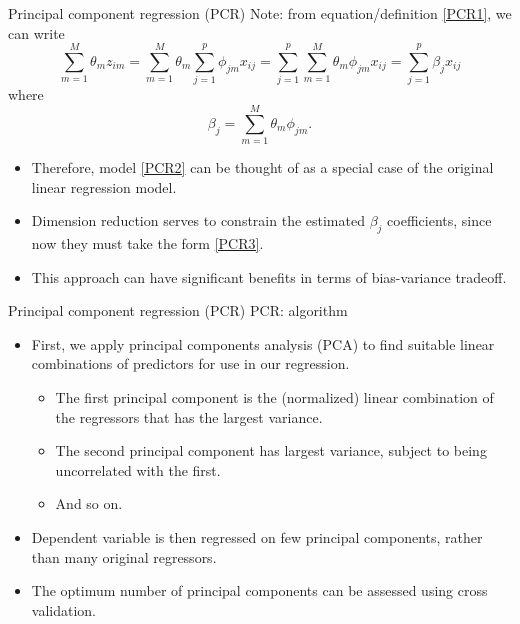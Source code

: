 \documentclass{beamer}
\begin{document}
\begin{frame}{Principal component regression (PCR)}
Note: from equation/definition \eqref{PCR1}, we can write
$$ \sum_{m=1}^M \theta_m z_{im} 
= \sum_{m=1}^M \theta_m \sum_{j=1}^p \phi_{jm} x_{ij} 
= \sum_{j=1}^p \sum_{m=1}^M \theta_m \phi_{jm} x_{ij} 
= \sum_{j=1}^p \beta_j x_{ij} 
$$ 
where 
\begin{equation} \label{PCR3}
\beta_j = \sum_{m=1}^M \theta_m \phi_{jm}.
\end{equation}
\begin{itemize}
\item Therefore, model \eqref{PCR2} can be thought of as a special case of the original linear regression model.
\item Dimension reduction serves to constrain the estimated $\beta_j$ coefficients, since now they must take the form \eqref{PCR3}.
\item This approach can have significant benefits in terms of bias-variance tradeoff.
\end{itemize}
\end{frame}
\begin{frame}{Principal component regression (PCR)}
PCR: algorithm
\begin{itemize}
\medskip
\item First, we apply principal components analysis (PCA) to find suitable linear combinations of predictors for use in our regression.
\medskip
\begin{itemize}
    \item The first principal component is the (normalized) linear
combination of the regressors that has the largest variance.
\medskip 
\item The second principal component has largest variance,
subject to being uncorrelated with the first.
\medskip
\item And so on. 
\end{itemize}
\medskip
\item Dependent variable is then regressed on few principal components, rather than many original regressors.\\ \medskip
\item The optimum number of principal components can be assessed using cross validation.
\end{itemize}
\bigskip
\end{frame}
\end{document}

